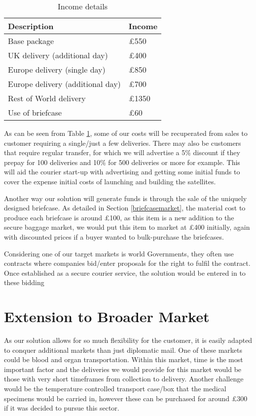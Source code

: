 \begin{table}[H]
    \centering
    \begin{tabular}{|p{}|p{}|}
        \hline
        \textbf{Description} & \textbf{Income} \\
        \hline
        Base package & £550 \\
         \hline
        UK delivery (additional day) & £400 \\
        \hline
        Europe delivery (single day) & £850 \\
        \hline
        Europe delivery (additional day) & £700\\
        \hline
        Rest of World delivery & £1350\\
        \hline
        Use of briefcase & £60\\
        \hline
    \end{tabular}
    \caption{Income details}
    \label{tab:customerPricing}
\end{table}

As can be seen from Table \ref{tab:customerPricing}, some of our costs will be recuperated from sales to customer requiring a single/just a few deliveries. There may also be customers that require regular transfer, for which we will advertise a 5\% discount if they prepay for 100 deliveries and 10\% for 500 deliveries or more for example. This will aid the courier start-up with advertising and getting some initial funds to cover the expense initial costs of launching and building the satellites.

Another way our solution will generate funds is through the sale of the uniquely designed briefcase. As detailed in Section \ref{briefcasemarket}, the material cost to produce each briefcase is around £100, as this item is a new addition to the secure baggage market, we would put this item to market at £400 initially, again with discounted prices if a buyer wanted to bulk-purchase the briefcases. 

Considering one of our target markets is world Governments, they often use contracts where companies bid/enter proposals for the right to fulfil the contract. Once established as a secure courier service, the solution would be entered in to these bidding 

\section{Extension to Broader Market}
As our solution allows for so much flexibility for the customer, it is easily adapted to conquer additional markets than just diplomatic mail. One of these markets could be blood and organ transportation. Within this market, time is the most important factor and the deliveries we would provide for this market would be those with very short timeframes from collection to delivery. Another challenge would be the temperature controlled transport case/box that the medical specimens would be carried in, however these can be purchased for around £300 \cite{courierCoolers} if it was decided to pursue this sector. 


